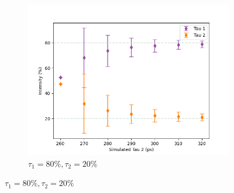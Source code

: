 \begin{figure}[p]
\begin{subfigure}{0.7\textwidth}
        \includegraphics[width=.95\textwidth]{Batch 3/regular IRF/tau1 220/output/8020.png}
        \caption{$\tau_1 = 80\%, \tau_2 = 20\%$}
        \label{fig:220-8020}
    \end{subfigure}
    \label{fig:220}
\end{figure}

